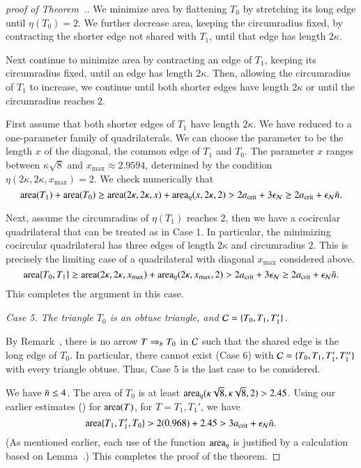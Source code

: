 \begin{proof}[proof of Theorem~.]
We minimize area by flattening $T_0$ by stretching its long edge until
$\eta(T_0)=2$.  We further decrease area, keeping the circumradius
fixed, by contracting the shorter edge not shared with $T_1$, until
that edge has length $2\kappa$.

Next continue to minimize area by contracting an edge of $T_1$,
keeping its circumradius fixed, until an edge has length $2\kappa$.
Then, allowing the circumradius of $T_1$ to increase, we continue until
both shorter edges have length $2\kappa$ or until the circumradius
reaches $2$.

First assume that both shorter edges of $T_1$ have length $2\kappa$.
We have reduced to a one-parameter family of quadrilaterals.  We can
choose the parameter to be the length $x$ of the diagonal, the common
edge of $T_1$ and $T_0$.  The parameter $x$ ranges between
$\kappa\sqrt{8}$ and $x_{\max}\approx 2.9594$, determined by the
condition $\eta(2\kappa,2\kappa,x_{\max}) = 2$.  We check numerically
that
\[
{\operatorname{area}}(T_1) + {\operatorname{area}}(T_0) \ge {\operatorname{area}}(2\kappa,2\kappa,x) +
{\operatorname{area}}_\eta(x,2\kappa,2) > 2a_\text{crit} + 3 \epsilon_{\mathcal N} \ge 2a_\text{crit} + \epsilon_{\mathcal N} \bar n.
\] %

Next, assume the circumradius of $\eta(T_1)$ reaches $2$, then we
have a cocircular quadrilateral that can be treated as in Case 1.  In
particular, the minimizing cocircular quadrilateral has three edges of
length $2\kappa$ and circumradius $2$.  This is precisely the limiting
case of a quadrilateral with diagonal $x_{\max}$ considered above.
\[
{\operatorname{area}}\{T_0,T_1\}
\ge {\operatorname{area}}(2\kappa,2\kappa,x_{\max})+{\operatorname{area}}_\eta(2\kappa,x_{\max},2)
>  2a_\text{crit}+3\epsilon_{\mathcal N} \ge 2a_\text{crit}+\epsilon_{\mathcal N}\bar n.
\]
This completes the argument in this case.

{\it Case 5. The triangle $T_0$ is an obtuse triangle, and $\mathcal C=\{T_0,T_1,T_1'\}$.}  

By Remark~, there is no arrow $T \Rightarrow_{b} T_0$ in $\mathcal C$
such that the shared edge is the long edge of $T_0$.  In particular,
there cannot exist (Case 6) with $\mathcal C=\{T_0,T_1,T_1',T_1''\}$ with
every triangle obtuse.  Thus, Case 5 is the last case to be
considered.

We have $\bar n\le 4$.
The area of $T_0$ is at least
${\operatorname{area}}_\eta(\kappa\sqrt{8},\kappa\sqrt{8},2) > 2.45$.  
Using our earlier estimates ()
for ${\operatorname{area}}(T)$, for $T=T_1,T_1'$, we
have
\[
{\operatorname{area}}\{T_1,T_1',T_0\} > 2 (0.968) + 2.45 > 3a_\text{crit} + \epsilon_{\mathcal N}\bar n.
\] %
(As mentioned earlier, each use of the function ${\operatorname{area}}_\eta$ is justified
by a calculation based on Lemma~.)
This completes the proof of the theorem.
\end{proof}


